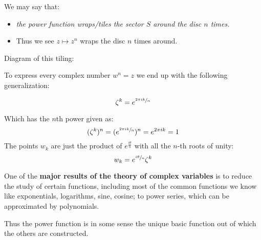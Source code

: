 We may say that:
\begin{itemize}
	\item \textit{the power function wraps/tiles the sector $S$ around the disc $n$ times.}
	\item Thus we see $z \mapsto z^n$ wraps the disc $n$ times around.
\end{itemize}

Diagram of this tiling:


To express every complex number $w^n = z$ we end up with the following generalization:
\begin{defn}
	\[\zeta^k = e^{\sfrac{2\pi ik}{n}}\]
\end{defn}
Which has the $n$th power given as:
\[ (\zeta^k)^n = ( e^{\sfrac{2\pi ik}{n}} )^n = e^{2\pi ik} = 1 \]
The points $w_k$ are just the product of $e^{\frac{i\theta}{n}}$ with all the $n$-th roots of unity:
\[w_k = e^{\sfrac{i\theta}{n}}\zeta^k\]

One of the \textbf{major results of the theory of complex variables} is to reduce the study of certain functions, including most of the 
common functions we know like exponentials, logarithms, sine, cosine; to power series, which can be approximated by polynomials.

Thus the power function is in some sense the unique basic function out of which the others are constructed.


